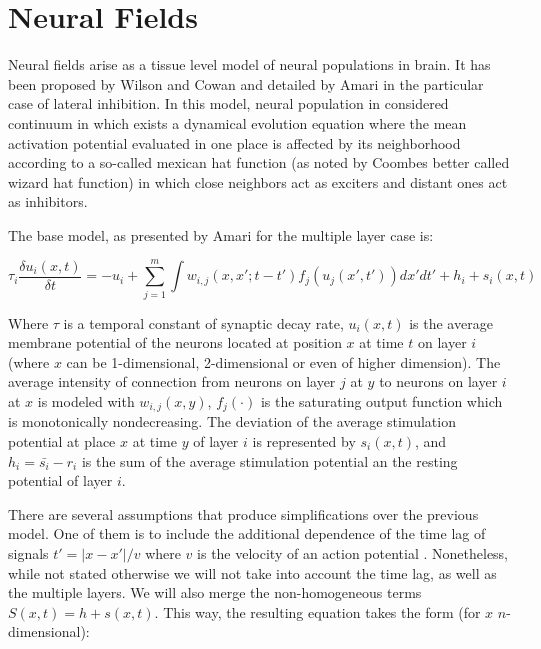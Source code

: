\section{Neural Fields}
Neural fields arise as a tissue level model of neural populations in
brain. It has been proposed by Wilson and Cowan
\cite{Wilson72Excitatory} and detailed by Amari \cite{Amari77Dynamics}
in the particular case of lateral inhibition. In this model, neural
population in considered continuum in which exists a dynamical
evolution equation where the mean activation potential evaluated in
one place is affected by its neighborhood according to a so-called
mexican hat function (as noted by Coombes \cite{Coombes05Waves} better
called wizard hat function) in which close neighbors act as exciters
and distant ones act as inhibitors.

The base model, as presented by Amari \cite{Amari77Dynamics} for the
multiple layer case is:

\begin{equation}
  \label{eq:nf-base}
  \tau_i\frac{\delta u_i(x,t)}{\delta
    t}=-u_i+\sum_{j=1}^{m}{\int{w_{i,j}(x,x';t-t')f_j\left(
        u_j(x',t')\right) dx' dt'}+h_i+s_i(x,t)}
\end{equation}

Where $\tau$ is a temporal constant of synaptic decay rate, $u_i(x,t)$
is the average membrane potential of the neurons located at position
$x$ at time $t$ on layer $i$ (where $x$ can be 1-dimensional,
2-dimensional or even of higher dimension). The average intensity of
connection from neurons on layer $j$ at $y$ to neurons on layer $i$ at
$x$ is modeled with $w_{i,j}(x,y)$, $f_j(\cdot)$ is the saturating
output function which is monotonically nondecreasing. The deviation of
the average stimulation potential at place $x$ at time $y$ of layer
$i$ is represented by $s_i(x,t)$, and $h_i=\bar{s_i}-r_i$ is the sum
of the average stimulation potential an the resting potential of layer
$i$.


There are several assumptions that produce simplifications over the
previous model. One of them is to include the additional dependence of
the time lag of signals $t'=\lvert x-x'\rvert /v$ where $v$ is the
velocity of an action potential
\cite{Wilson72Excitatory}. Nonetheless, while not stated otherwise we
will not take into account the time lag, as well as the multiple
layers. We will also merge the non-homogeneous terms
$S(x,t)=h+s(x,t)$. This way, the resulting equation takes the form
(for $x$ $n$-dimensional):

